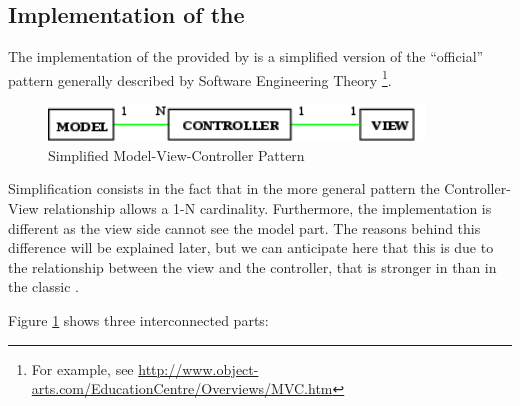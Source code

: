 \subsection{\label{MVC} Implementation of the \mvc}

The implementation of the \mvc provided by \pygtkmvc is a simplified
version of the ``official'' pattern generally described by Software
Engineering Theory \footnote{For example, see
  \url{http://www.object-arts.com/EducationCentre/Overviews/MVC.htm}}.

\begin{figure}[htbp]
\begin{center}
\includegraphics[width=10cm]{figs/png/mvc}
\caption{\label{MVC_f}Simplified Model-View-Controller Pattern}
\end{center}
\end{figure}
Simplification consists in the fact that in the more general pattern
the Controller-View relationship allows a 1-N cardinality.
Furthermore, the implementation is different as the view side cannot
see the model part. The reasons behind this difference will be
explained later, but we can anticipate here that this is due to the
relationship between the view and the controller, that is stronger in
\pygtkmvc than in the classic \mvc.

\smallskip

Figure \ref{MVC_f} shows three interconnected parts:

